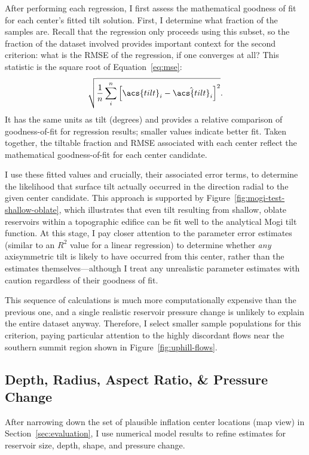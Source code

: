 After performing each regression, I first assess the mathematical goodness of fit for each center's fitted tilt solution. First, I determine what fraction of the samples are. Recall that the regression only proceeds using this subset, so the fraction of the dataset involved provides important context for the second criterion: what is the \ac{RMSE} of the regression, if one converges at all? This statistic is the square root of Equation~\eqref{eq:mse}:
\begin{equation}
    \sqrt{\frac{1}{n}\sum_{i}^{n}{\left[\acs{tilt}_i-\hat{\acs{tilt}}_i\right]}^2}.\label{eq:rmse}
\end{equation}
It has the same units as \acs{tilt} (degrees) and provides a relative comparison of goodness-of-fit for regression results; smaller values indicate better fit. Taken together, the tiltable fraction and \ac{RMSE} associated with each center reflect the mathematical goodness-of-fit for each center candidate.

I use these fitted values and crucially, their associated error terms, to determine the likelihood that surface tilt actually occurred in the direction radial to the given center candidate. This approach is supported by Figure~\ref{fig:mogi-test-shallow-oblate}, which illustrates that even tilt resulting from shallow, oblate reservoirs within a topographic edifice can be fit well to the analytical Mogi tilt function. At this stage, I pay closer attention to the parameter error estimates (similar to an $R^2$ value for a linear regression) to determine whether \emph{any} axisymmetric tilt is likely to have occurred from this center, rather than the estimates themselves---although I treat any unrealistic parameter estimates with caution regardless of their goodness of fit.

This sequence of calculations is much more computationally expensive than the previous one, and a single realistic reservoir pressure change is unlikely to explain the entire dataset anyway. Therefore, I select smaller sample populations for this criterion, paying particular attention to the highly discordant flows near the southern summit region shown in Figure~\ref{fig:uphill-flows}.

\subsection{Depth, Radius, Aspect Ratio, \& Pressure Change}

After narrowing down the set of plausible inflation center locations (map view) in Section~\ref{sec:evaluation}, I use numerical model results to refine estimates for reservoir size, depth, shape, and pressure change.

